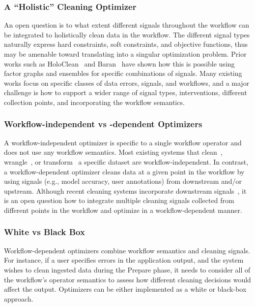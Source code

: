 \documentclass[11pt,dvipsnames]{article}
\begin{document}
\subsubsection{A ``Holistic'' Cleaning Optimizer}
An open question is to what extent different signals throughout the workflow can be integrated to holistically clean data in the workflow.  The different signal types naturally express hard  constraints, soft constraints, and objective functions, thus may be amenable toward translating into a singular optimization problem.  Prior works such as HoloClean~\cite{HoloClean} and Baran~\cite{Baran} have shown how this is possible using factor graphs and ensembles for specific combinations of signals.  Many existing works focus on specific classes of data errors, signals, and workflows, and a major challenge is how to support a wider range of signal types, interventions, different collection points, and incorporating the workflow semantics.  


\subsubsection{Workflow-independent vs -dependent Optimizers}
A workflow-independent optimizer is specific to a single workflow operator and does not use any workflow semantics.  Most existing systems that clean~\cite{HoloClean,NADEEF}, wrangle~\cite{datawrangler,NADEEF,OpenRefine}, or transform~\cite{DataXFormer} a specific dataset are workflow-independent. 
In contrast, a workflow-dependent optimizer cleans data at a given point in the workflow by using signals (e.g., model accuracy, user annotations) from downstream and/or upstream.   Although recent cleaning systems incorporate downstream signals~\cite{BoostClean,AlphaClean,CPClean,AutoSklearn}, it is an open question how to integrate multiple cleaning signals collected from different points in the workflow and optimize in a workflow-dependent manner.


\subsubsection{White vs Black Box}

Workflow-dependent optimizers combine workflow semantics and cleaning signals.  For instance, if a user specifies errors in the application output, and the system wishes to clean ingested data during the Prepare phase, it needs to consider all of the workflow's operator semantics to assess how different cleaning decisions would affect the output.  
Optimizers can be either implemented as a white or black-box approach. 
\end{document}
